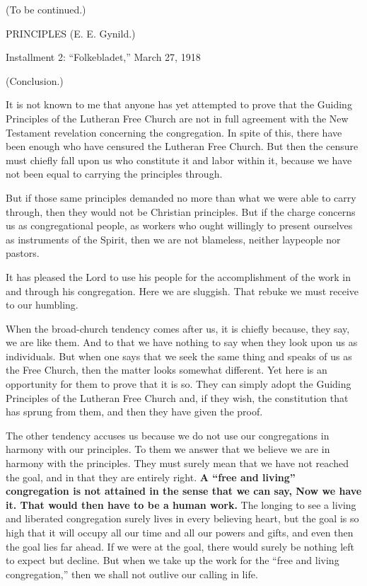 (To be continued.)

PRINCIPLES
(E. E. Gynild.)

Installment 2: “Folkebladet,” March 27, 1918

(Conclusion.)

It is not known to me that anyone has yet attempted to prove that the Guiding Principles of the Lutheran Free Church are not in full agreement with the New Testament revelation concerning the congregation. In spite of this, there have been enough who have censured the Lutheran Free Church. But then the censure must chiefly fall upon us who constitute it and labor within it, because we have not been equal to carrying the principles through.

But if those same principles demanded no more than what we were able to carry through, then they would not be Christian principles. But if the charge concerns us as congregational people, as workers who ought willingly to present ourselves as instruments of the Spirit, then we are not blameless, neither laypeople nor pastors.

It has pleased the Lord to use his people for the accomplishment of the work in and through his congregation. Here we are sluggish. That rebuke we must receive to our humbling.

When the broad-church tendency comes after us, it is chiefly because, they say, we are like them. And to that we have nothing to say when they look upon us as individuals. But when one says that we seek the same thing and speaks of us as the Free Church, then the matter looks somewhat different. Yet here is an opportunity for them to prove that it is so. They can simply adopt the Guiding Principles of the Lutheran Free Church and, if they wish, the constitution that has sprung from them, and then they have given the proof.

The other tendency accuses us because we do not use our congregations in harmony with our principles. To them we answer that we believe we are in harmony with the principles. They must surely mean that we have not reached the goal, and in that they are entirely right. \textbf{A “free and living” congregation is not attained in the sense that we can say, Now we have it. That would then have to be a human work.} The longing to see a living and liberated congregation surely lives in every believing heart, but the goal is so high that it will occupy all our time and all our powers and gifts, and even then the goal lies far ahead. If we were at the goal, there would surely be nothing left to expect but decline. But when we take up the work for the “free and living congregation,” then we shall not outlive our calling in life.

